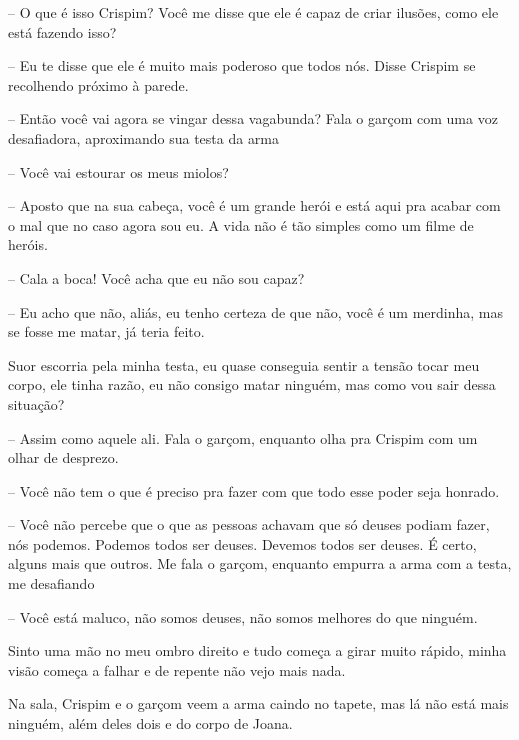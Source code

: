 -- O que é isso Crispim? Você me disse que ele é capaz de criar ilusões, como ele está fazendo isso?

-- Eu te disse que ele é muito mais poderoso que todos nós. Disse Crispim se recolhendo próximo à parede.

-- Então você vai agora se vingar dessa vagabunda? Fala o garçom com uma voz desafiadora, aproximando sua testa da arma

-- Você vai estourar os meus miolos?

-- Aposto que na sua cabeça, você é um grande herói e está aqui pra acabar com o mal que no caso agora sou eu. A vida não é tão simples como um filme de heróis.

-- Cala a boca! Você acha que eu não sou capaz?

-- Eu acho que não, aliás, eu tenho certeza de que não, você é um merdinha, mas se fosse me matar, já teria feito. 

Suor escorria pela minha testa, eu quase conseguia sentir a tensão tocar meu corpo, ele tinha razão, eu não consigo matar ninguém, mas como vou sair dessa situação?

-- Assim como aquele ali. Fala o garçom, enquanto olha pra Crispim com um olhar de desprezo.

-- Você não tem o que é preciso pra fazer com que todo esse poder seja honrado.

-- Você não percebe que o que as pessoas achavam que só deuses podiam fazer, nós podemos. Podemos todos ser deuses. Devemos todos ser deuses. É certo, alguns mais que outros. Me fala o garçom, enquanto empurra a arma com a testa, me desafiando

-- Você está maluco, não somos deuses, não somos melhores do que ninguém.

Sinto uma mão no meu ombro direito e tudo começa a girar muito rápido, minha visão começa a falhar e de repente não vejo mais nada.

Na sala, Crispim e o garçom veem a arma caindo no tapete, mas lá não está mais ninguém, além deles dois e do corpo de Joana.  


